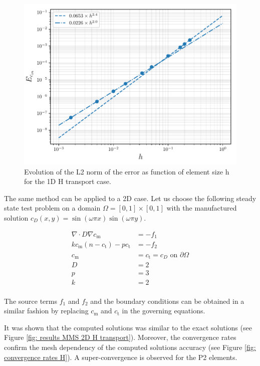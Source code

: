 \begin{figure}
    \centering
    \includegraphics[width=1\linewidth]{"Figures/Chapter3/L2 error on Cm vs h"}
    \caption{Evolution of the L2 norm of the error as function of element size h for the 1D H transport case.}
    \label{fig:error vs h}
\end{figure}

The same method can be applied to a 2D case.
Let us choose the following steady state test problem on a domain $\Omega = [0, 1] \times [0, 1]$ with the manufactured solution $c_D(x, y) = \sin(\omega \pi x) \sin(\omega \pi y)$.

\begin{align}
    \nabla \cdot D \nabla c_\mathrm{m} &= -f_1 \\
    k c_\mathrm{m} (n - c_\mathrm{t}) - p c_\mathrm{t} &= -f_2 \\
    c_\mathrm{m} &= c_\mathrm{t} = c_D \text{  on  } \partial \Omega \\
    D &= 2 \\
    p &= 3 \\
    k &= 2 \\
\end{align}

The source terms $f_1$ and $f_2$ and the boundary conditions can be obtained in a similar fashion by replacing $c_\mathrm{m}$ and $c_\mathrm{t}$ in the governing equations.

It was shown that the computed solutions was similar to the exact solutions (see Figure \ref{fig: results MMS 2D H transport}).
Moreover, the convergence rates confirm the mesh dependency of the computed solutions accuracy (see Figure \ref{fig: convergence rates H}).
A super-convergence is observed for the P2 elements.

